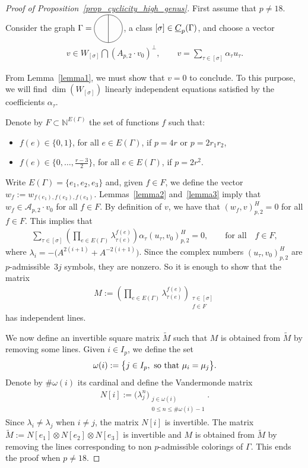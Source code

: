 \documentclass[11pt]{article}
\numberwithin{equation}{section}
\begin{document}
\begin{proof}[Proof of Proposition~\ref{prop_cyclicity_high_genus}]First assume that $p\neq 18$. Consider the graph $\Gamma=\Thetagraph$, a class $[\sigma]\in \underline{C}_p(\Gamma)$, and choose a vector
\begin{gather*}
 v \in W_{[\sigma]}\bigcap \left( A_{p,2}\cdot v_0\right)^{\bot},\qquad v = \sum_{\tau\in [\sigma]}{\alpha_{\tau}u_{\tau}}.
\end{gather*}

From Lemma~\ref{lemma1}, we must show that $v=0$ to conclude. To this purpose, we will find $\dim \left(W_{[\sigma]}\right)$ linearly independent equations satisfied by the coefficients $\alpha_{\tau}$.

Denote by $F\subset \mathbb{N}^{E(\Gamma)}$ the set of functions $f$ such that:
\begin{itemize}\itemsep=0pt
\item $f(e) \in \{0,1\}$, for all $e\in E(\Gamma)$, if $p=4r$ or $p=2r_1r_2$,
\item $f(e) \in \big\{ 0, \ldots, \frac{r-3}{2} \big\}$, for all $e \in E(\Gamma)$, if $p=2r^2$.
\end{itemize}
Write $E(\Gamma)=\{e_1, e_2, e_3\}$ and, given $f\in F$, we define the vector $w_f:= w_{f(e_1), f(e_2), f(e_3)}$. Lemmas~\ref{lemma2} and~\ref{lemma3} imply that $w_f\in \mathcal{A}_{p,2}\cdot v_0$ for all $f\in F$. By definition of $v$, we have that $(w_f, v)_{p,2}^H = 0$ for all $f\in F$. This implies that
\begin{gather*}
 \sum_{\tau\in [\sigma]}{\left( \prod_{e\in E(\Gamma)}{\lambda_{\tau(e)}^{f(e)}}\right) \alpha_{\tau} \left( u_{\tau}, v_0 \right)_{p,2}^H } =0, \qquad \text{for all} \quad f\in F,
\end{gather*}
where $\lambda_i = -\big(A^{2(i+1)}+A^{-2(i+1)}\big)$. Since the complex numbers $( u_{\tau}, v_0)_{p,2}^H$ are $p$-admissible~$3j$ symbols, they are nonzero. So it is enough to show that the matrix
\begin{gather*} M := \left(\prod_{e\in E(\Gamma)}{\lambda_{\tau(e)}^{f(e)}}\right)_{\substack{\tau\in[\sigma] \\ f\in F}} \end{gather*}
has independent lines.

We now define an invertible square matrix $\widetilde{M}$ such that $M$ is obtained from $\widetilde{M}$ by removing some lines. Given $i\in I_p$, we define the set
\begin{gather*} \omega(i) := \big\{ j\in I_p, \mbox{ so that }\mu_{i}=\mu_{j} \big\}.\end{gather*}
Denote by $\# \omega(i)$ its cardinal and define the Vandermonde matrix
\begin{gather*} N[i] := \big( \lambda_j^n \big) _{\substack{ j \in \omega(i)\\ 0\leq n \leq \# \omega(i) -1 }}.\end{gather*}
Since $\lambda_i\neq \lambda_j$ when $i\neq j $, the matrix $N[i]$ is invertible. The matrix $ \widetilde{M} := N[e_1]\otimes N[e_2] \otimes N[e_3]$ is invertible and $M$ is obtained from $\widetilde{M}$ by removing the lines corresponding to non $p$-admissible colorings of $\Gamma$. This ends the proof when $p\neq 18$.


\end{proof}
\end{document}
